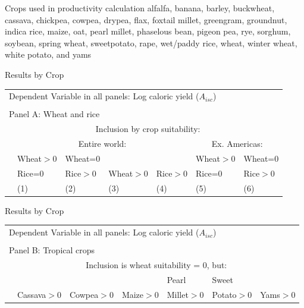 \documentclass[10pt, xcolor=dvipsnames]{beamer}
\begin{document}
\begin{frame}{Crops used in productivity calculation}\label{crops}
alfalfa, banana, barley, buckwheat, cassava, chickpea, cowpea, drypea, flax, foxtail millet, greengram, groundnut, indica rice, maize, oat, pearl millet, phaselous bean, pigeon pea, rye, sorghum, soybean, spring wheat, sweetpotato, rape, wet/paddy rice, wheat, winter wheat, white potato, and yams

\hfill \hyperlink{data}{}
\end{frame}

\begin{frame}{Results by Crop}\label{cropreg}

{\scriptsize
\begin{tabularx}{\textwidth}{lXXXXXX}
\midrule
\multicolumn{7}{l}{Dependent Variable in all panels: Log caloric yield ($A_{isc}$)} \\ \\
\multicolumn{7}{l}{Panel A: Wheat and rice} \\
 & \multicolumn{6}{c}{Inclusion by crop suitability:} \\ \cmidrule(lr){2-7}
 & \multicolumn{4}{c}{Entire world:} & \multicolumn{2}{c}{Ex. Americas:}\\ \cmidrule(lr){2-5} \cmidrule(lr){6-7} 
 & Wheat$>$0& Wheat=0 &         &        & Wheat$>$0   & Wheat=0   \\
 & Rice=0 & Rice$>$0  & Wheat$>$0 & Rice$>$0 & Rice=0    & Rice$>$0   \\
 & (1) & (2) & (3) & (4) & (5) & (6) \\
\midrule

\midrule
\end{tabularx}
}

\end{frame}

\begin{frame}{Results by Crop}

{\scriptsize
\begin{tabularx}{\textwidth}{lXXXXXX}
\midrule
\multicolumn{7}{l}{Dependent Variable in all panels: Log caloric yield ($A_{isc}$)} \\ \\
\multicolumn{7}{l}{Panel B: Tropical crops} \\
                   & \multicolumn{6}{c}{Inclusion is wheat suitability = 0, but:} \\ \cmidrule(lr){2-7}
                   &            &              &          &   Pearl       &  Sweet      & \\
& Cassava$>$0 & Cowpea$>$0  & Maize$>$0 & Millet$>$0 & Potato$>$0 & Yams$>$0   \\
\midrule

\midrule
\end{tabularx}
}

\end{frame}
\end{document}
